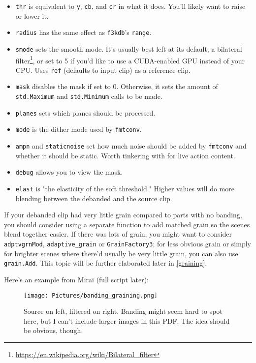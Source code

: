 \documentclass{scrartcl}
\begin{document}
\begin{itemize}
\item \texttt{thr} is equivalent to \texttt{y}, \texttt{cb}, and \texttt{cr} in what it does.  You'll likely want to raise or lower it.
\item \texttt{radius} has the same effect as \texttt{f3kdb}'s \texttt{range}.
\item \texttt{smode} sets the smooth mode.  It's usually best left at its default, a bilateral filter\footnote{\url{https://en.wikipedia.org/wiki/Bilateral_filter}}, or set to 5 if you'd like to use a CUDA-enabled GPU instead of your CPU.  Uses \texttt{ref} (defaults to input clip) as a reference clip.
\item \texttt{mask} disables the mask if set to 0.  Otherwise, it sets the amount of \texttt{std.Maximum} and \texttt{std.Minimum} calls to be made.
\item \texttt{planes} sets which planes should be processed.
\item \texttt{mode} is the dither mode used by \texttt{fmtconv}.
\item \texttt{ampn} and \texttt{staticnoise} set how much noise should be added by \texttt{fmtconv} and whether it should be static.  Worth tinkering with for live action content.
\item \texttt{debug} allows you to view the mask.
\item \texttt{elast} is "the elasticity of the soft threshold."  Higher values will do more blending between the debanded and the source clip.
\end{itemize}

If your debanded clip had very little grain compared to parts with no banding, you should consider using a separate function to add matched grain so the scenes blend together easier. If there was lots of grain, you might want to consider \texttt{adptvgrnMod}, \texttt{adaptive\_grain} or \texttt{GrainFactory3}; for less obvious grain or simply for brighter scenes where there'd usually be very little grain, you can also use \texttt{grain.Add}. This topic will be further elaborated later in \ref{graining}.\\
\pagebreak

Here's an example from Mirai (full script later):
\begin{figure}[h]
\centering
\texttt{[image: Pictures/banding\_graining.png]}
\caption{Source on left, filtered on right.  Banding might seem hard to spot here, but I can't include larger images in this PDF.  The idea should be obvious, though.}\label{fig:3}
\end{figure}
\end{document}
